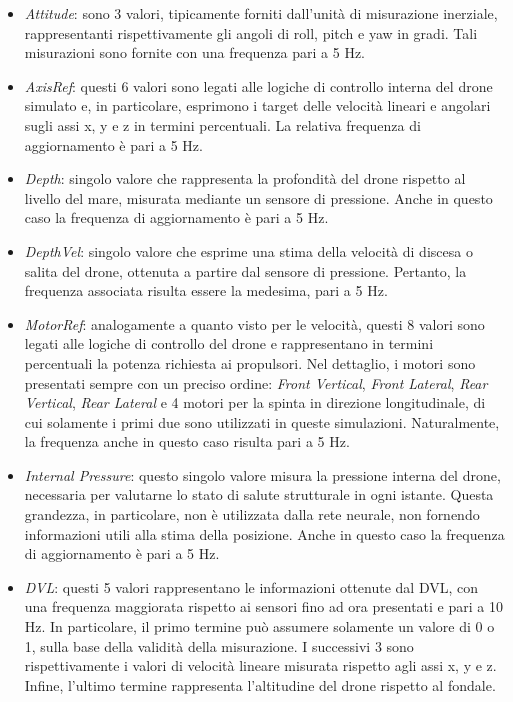     \begin{itemize}

        \item \textit{Attitude}: sono 3 valori, tipicamente forniti dall'unità di misurazione inerziale, rappresentanti rispettivamente gli angoli di roll, pitch e yaw in gradi. Tali misurazioni sono fornite con una frequenza pari a 5 Hz.

        \item \textit{AxisRef}: questi 6 valori sono legati alle logiche di controllo interna del drone simulato e, in particolare, esprimono i target delle velocità lineari e angolari sugli assi x, y e z in termini percentuali. La relativa frequenza di aggiornamento è pari a 5 Hz.

        \item \textit{Depth}: singolo valore che rappresenta la profondità del drone rispetto al livello del mare, misurata mediante un sensore di pressione. Anche in questo caso la frequenza di aggiornamento è pari a 5 Hz. 

        \item \textit{DepthVel}: singolo valore che esprime una stima della velocità di discesa o salita del drone, ottenuta a partire dal sensore di pressione. Pertanto, la frequenza associata risulta essere la medesima, pari a 5 Hz. 

        \item \textit{MotorRef}: analogamente a quanto visto per le velocità, questi 8 valori sono legati alle logiche di controllo del drone e rappresentano in termini percentuali la potenza richiesta ai propulsori. Nel dettaglio, i motori sono presentati sempre con un preciso ordine: \emph{Front Vertical}, \emph{Front Lateral}, \emph{Rear Vertical}, \emph{Rear Lateral} e 4 motori per la spinta in direzione longitudinale, di cui solamente i primi due sono utilizzati in queste simulazioni. Naturalmente, la frequenza anche in questo caso risulta pari a 5 Hz.    
        
        \item \textit{Internal Pressure}: questo singolo valore misura la pressione interna del drone, necessaria per valutarne lo stato di salute strutturale in ogni istante. Questa grandezza, in particolare, non è utilizzata dalla rete neurale, non fornendo informazioni utili alla stima della posizione. Anche in questo caso la frequenza di aggiornamento è pari a 5 Hz. 

        \item \textit{DVL}: questi 5 valori rappresentano le informazioni ottenute dal DVL, con una frequenza maggiorata rispetto ai sensori fino ad ora presentati e pari a 10 Hz. In particolare, il primo termine può assumere solamente un valore di 0 o 1, sulla base della validità della misurazione. I successivi 3 sono rispettivamente i valori di velocità lineare misurata rispetto agli assi x, y e z. Infine, l'ultimo termine rappresenta l'altitudine del drone rispetto al fondale.
        
    \end{itemize}

